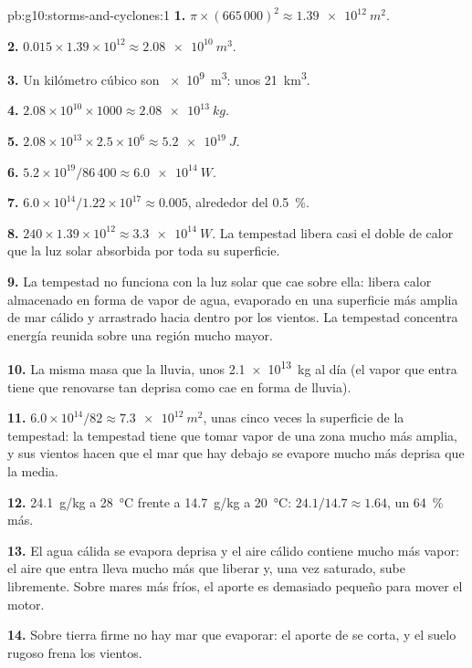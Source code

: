 \begin{solution}{pb:g10:storms-and-cyclones:1}
\textbf{1.} $\pi \times (665\,000)^2 \approx \qty{1.39e12}{m^2}$.

\textbf{2.} $0.015 \times 1.39\times10^{12} \approx \qty{2.08e10}{m^3}$.

\textbf{3.} Un kilómetro cúbico son \qty{e9}{m^3}: unos \qty{21}{km^3}.

\textbf{4.} $2.08\times10^{10} \times 1000 \approx \qty{2.08e13}{kg}$.

\textbf{5.} $2.08\times10^{13} \times 2.5\times10^6 \approx \qty{5.2e19}{J}$.

\textbf{6.} $5.2\times10^{19}/86\,400 \approx \qty{6.0e14}{W}$.

\textbf{7.} $6.0\times10^{14}/1.22\times10^{17} \approx 0.005$, alrededor del
\qty{0.5}{\percent}.

\textbf{8.} $240 \times 1.39\times10^{12} \approx \qty{3.3e14}{W}$. La
tempestad libera casi el doble de calor que la luz solar absorbida por toda
su superficie.

\textbf{9.} La tempestad no funciona con la luz solar que cae sobre ella:
libera calor almacenado en forma de vapor de agua, evaporado en una
superficie más amplia de mar cálido y arrastrado hacia dentro por los
vientos. La tempestad concentra energía reunida sobre una región mucho
mayor.

\textbf{10.} La misma masa que la lluvia, unos \qty{2.1e13}{kg} al día (el
vapor que entra tiene que renovarse tan deprisa como cae en forma de lluvia).

\textbf{11.} $6.0\times10^{14}/82 \approx \qty{7.3e12}{m^2}$, unas cinco
veces la superficie de la tempestad: la tempestad tiene que tomar vapor de
una zona mucho más amplia, y sus vientos hacen que el mar que hay debajo se
evapore mucho más deprisa que la media.

\textbf{12.} \qty{24.1}{g/kg} a \qty{28}{\degreeCelsius} frente a
\qty{14.7}{g/kg} a \qty{20}{\degreeCelsius}: $24.1/14.7 \approx 1.64$, un
\qty{64}{\percent} más.

\textbf{13.} El agua cálida se evapora deprisa y el aire cálido contiene
mucho más vapor: el aire que entra lleva mucho más  que
liberar y, una vez saturado, sube libremente. Sobre mares más fríos, el
aporte es demasiado pequeño para mover el motor.

\textbf{14.} Sobre tierra firme no hay mar que evaporar: el aporte de  se corta, y el suelo rugoso frena los vientos.


\end{solution}

